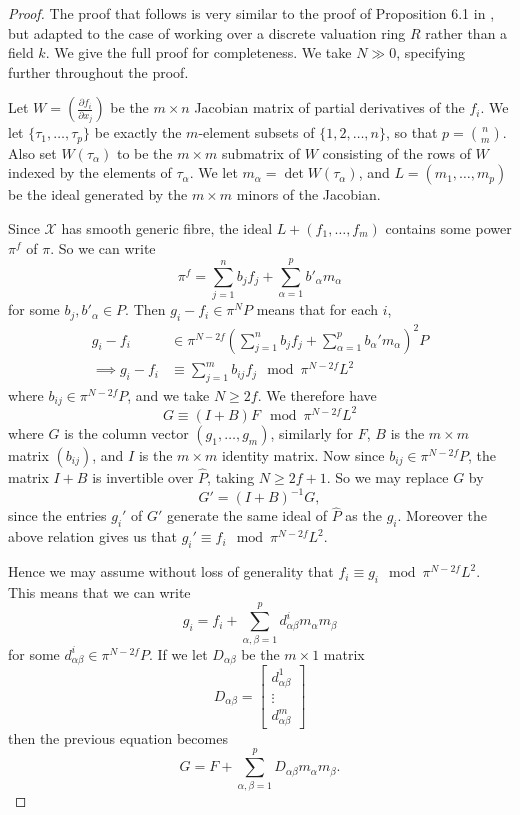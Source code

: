 \documentclass{article}
\theoremstyle{definition}
\theoremstyle{plain}
\theoremstyle{remark}
\begin{document}
	\begin{proof}
		The proof that follows is very similar to the proof of Proposition 6.1 in \cite{Cutkosky_Srinivasan_1993}, but adapted to the case of working over a discrete valuation ring $R$ rather than a field $k$. We give the full proof for completeness. We take $N\gg 0$, specifying further throughout the proof.
		
		Let $W = \left(\frac{\partial f_i}{\partial x_j}\right)$ be the $m\times n$ Jacobian matrix of partial derivatives of the $f_i$. We let $\{\tau_1, \ldots, \tau_p\}$ be exactly the $m$-element subsets of $\{1, 2, \ldots, n\}$, so that $p = \binom{n}{m}$. Also set $W(\tau_\alpha)$ to be the $m\times m$ submatrix of $W$ consisting of the rows of $W$ indexed by the elements of $\tau_\alpha$. We let $m_\alpha = \det W(\tau_\alpha)$, and $L = (m_1, \ldots, m_p)$ be the ideal generated by the $m\times m$ minors of the Jacobian.	
		
		Since $\mathcal{X}$ has smooth generic fibre, the ideal $L + (f_1, \ldots, f_m)$ contains some power $\pi^f$ of $\pi$. So we can write
		\[\pi^f = \sum_{j=1}^n b_jf_j + \sum_{\alpha=1}^p b'_\alpha m_\alpha\]
		for some $b_j, b'_\alpha\in P$. Then $g_i-f_i \in \pi^N P$ means that for each $i$,
		\begin{align*}
			g_i -f_i &\in \pi^{N-2f}\left(\sum_{j=1}^n b_jf_j + \sum_{\alpha=1}^p b_\alpha' m_\alpha\right)^2P\\
			\implies g_i-f_i&\equiv\sum_{j=1}^m b_{ij}f_j \mod{\pi^{N-2f}L^2}
		\end{align*}
		where $b_{ij}\in \pi^{N-2f}P$, and we take $N\ge 2f$. We therefore have 
		\[G \equiv (I + B)F \mod \pi^{N-2f}L^2\]
		where $G$ is the column vector $(g_1, \ldots, g_m)$, similarly for $F$, $B$ is the $m\times m$ matrix $(b_{ij})$, and $I$ is the $m\times m$ identity matrix. Now since $b_{ij}\in \pi^{N-2f}P$, the matrix $I+B$ is invertible over $\widehat{P}$, taking $N\ge 2f+1$. So we may replace $G$ by 
		\[G' = (I+B)^{-1}G,\]
		since the entries $g_i'$ of $G'$ generate the same ideal of $\widehat{P}$ as the $g_i$. Moreover the above relation gives us that $g_i'\equiv f_i \mod {\pi^{N-2f}L^2}$.
		
		Hence we may assume without loss of generality that $f_i\equiv g_i \mod {\pi^{N-2f}L^2}$. This means that we can write
		\[g_i = f_i + \sum_{\alpha, \beta=1}^p d^i_{\alpha\beta}m_\alpha m_\beta\]
		for some $d^i_{\alpha\beta}\in \pi^{N-2f}P$. If we let $D_{\alpha\beta}$ be the $m\times 1$ matrix
		\[D_{\alpha\beta} = \left[\begin{array}{c}
			d^1_{\alpha\beta}\\
			\vdots\\
			d^m_{\alpha\beta}
		\end{array}\right]\]
		then the previous equation becomes
		\[G = F + \sum_{\alpha, \beta = 1}^p D_{\alpha\beta}m_\alpha m_\beta.\tag*{($\dagger$)}\]
		

\end{proof}
\end{document}
